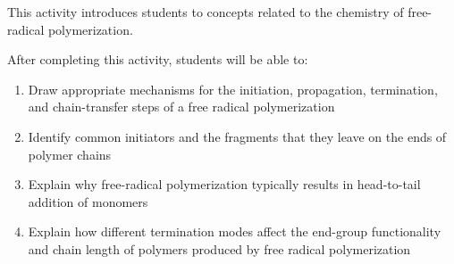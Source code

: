 %
%
%
%

\renewcommand{\figpath}{content/polymchem/freeradical/FRPchemistry/figs}
\renewcommand{\labelbase}{FRPchemistry}

\begin{activity}

\begin{instructornotes}
	This activity introduces students to concepts related to the chemistry of free-radical polymerization.
	
	After completing this activity, students will be able to:
	\begin{enumerate}
		\item Draw appropriate mechanisms for the initiation, propagation, termination, and chain-transfer steps of a free radical polymerization
		\item Identify common initiators and the fragments that they leave on the ends of polymer chains
		\item Explain why free-radical polymerization typically results in head-to-tail addition of monomers
		\item Explain how different termination modes affect the end-group functionality and chain length of polymers produced by free radical polymerization
	\end{enumerate}
	

\end{instructornotes}
\end{activity}
